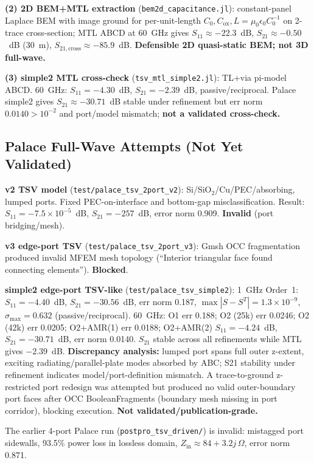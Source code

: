 \documentclass[12pt]{article}
\theoremstyle{definition}
\begin{document}
\textbf{(2) 2D BEM+MTL extraction} (\texttt{bem2d\_capacitance.jl}): constant-panel Laplace BEM with image ground for per-unit-length $C_0,C_{\mathrm{ox}},L=\mu_0\epsilon_0 C_0^{-1}$ on 2-trace cross-section; MTL ABCD at 60~GHz gives $S_{11}\approx -22.3$~dB, $S_{21}\approx -0.50$~dB (30~\textmu m), $S_{21,\mathrm{cross}}\approx -85.9$~dB. \textbf{Defensible 2D quasi-static BEM; not 3D full-wave.}

\textbf{(3) simple2 MTL cross-check} (\texttt{tsv\_mtl\_simple2.jl}): TL+via pi-model ABCD. 60~GHz: $S_{11}=-4.30$~dB, $S_{21}=-2.39$~dB, passive/reciprocal. Palace simple2 gives $S_{21}\approx -30.71$~dB stable under refinement but err norm $0.0140>10^{-2}$ and port/model mismatch; \textbf{not a validated cross-check.}

\subsection{Palace Full-Wave Attempts (Not Yet Validated)}

\textbf{v2 TSV model} (\texttt{test/palace\_tsv\_2port\_v2}): Si/SiO$_2$/Cu/PEC/absorbing, lumped ports. Fixed PEC-on-interface and bottom-gap misclassification. Result: $S_{11}=-7.5\times10^{-5}$~dB, $S_{21}=-257$~dB, error norm 0.909. \textbf{Invalid} (port bridging/mesh).

\textbf{v3 edge-port TSV} (\texttt{test/palace\_tsv\_2port\_v3}): Gmsh OCC fragmentation produced invalid MFEM mesh topology (``Interior triangular face found connecting elements''). \textbf{Blocked}.

\textbf{simple2 edge-port TSV-like} (\texttt{test/palace\_tsv\_simple2}): 1~GHz Order~1: $S_{11}=-4.40$~dB, $S_{21}=-30.56$~dB, err norm 0.187, $\max|S-S^T|=1.3\times10^{-9}$, $\sigma_{\max}=0.632$ (passive/reciprocal). 60~GHz: O1 err 0.188; O2 (25k) err 0.0246; O2 (42k) err 0.0205; O2+AMR(1) err 0.0188; O2+AMR(2) $S_{11}=-4.24$~dB, $S_{21}=-30.71$~dB, err norm 0.0140. $S_{21}$ stable across all refinements while MTL gives $-2.39$~dB. \textbf{Discrepancy analysis:} lumped port spans full outer z-extent, exciting radiating/parallel-plate modes absorbed by ABC; S21 stability under refinement indicates model/port-definition mismatch. A trace-to-ground z-restricted port redesign was attempted but produced no valid outer-boundary port faces after OCC BooleanFragments (boundary mesh missing in port corridor), blocking execution. \textbf{Not validated/publication-grade.}

The earlier 4-port Palace run (\texttt{postpro\_tsv\_driven/}) is invalid: mistagged port sidewalls, 93.5\% power loss in lossless domain, $Z_{\mathrm{in}}\approx 84+3.2j\,\Omega$, error norm 0.871.
\end{document}
